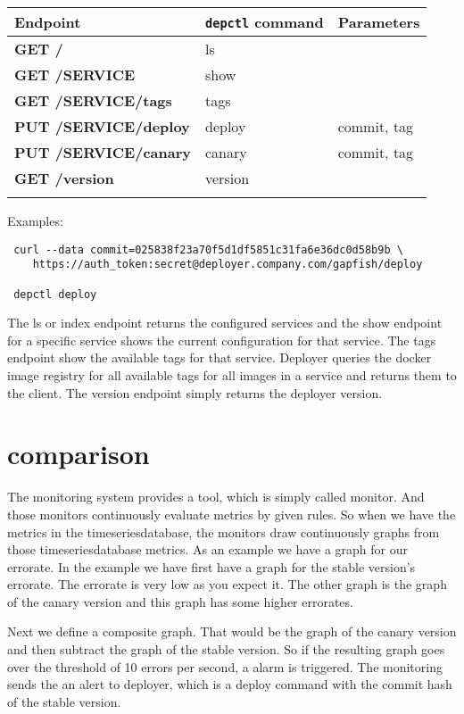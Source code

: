 \begin{table}[!htbp]
  \begin{tabular}{ l|l|l }
    Endpoint & \texttt{depctl} command & Parameters \\
    \hline \hline
    \textbf{GET /} & ls & \\
    \textbf{GET /SERVICE} & show & \\
    \textbf{GET /SERVICE/tags} & tags & \\
    \textbf{PUT /SERVICE/deploy} & deploy & commit, tag \\
    \textbf{PUT /SERVICE/canary} & canary & commit, tag \\
    \textbf{GET /version} & version & \\
    \multicolumn{3}{l}{} %
  \end{tabular}

  Examples:

\begin{verbatim}
 curl --data commit=025838f23a70f5d1df5851c31fa6e36dc0d58b9b \
    https://auth_token:secret@deployer.company.com/gapfish/deploy

 depctl deploy
\end{verbatim}
\end{table}

The ls or index endpoint returns the configured services and the show endpoint for a
specific service shows the current configuration for that service. The tags endpoint show
the available tags for that service. Deployer queries the docker image registry for all
available tags for all images in a service and returns them to the client. The version
endpoint simply returns the deployer version.

\section{comparison}
The monitoring system provides a tool, which is simply called monitor. And those monitors
continuously evaluate metrics by given rules. So when we have the metrics in the
timeseriesdatabase, the monitors draw continuously graphs from those timeseriesdatabase
metrics. As an example we have a graph for our errorate. In the example we have first have
a graph for the stable version's errorate. The errorate is very low as you expect it. The
other graph is the graph of the canary version and this graph has some higher errorates.

Next we define a composite graph. That would be the graph of the canary version and then
subtract the graph of the stable version. So if the resulting graph goes over the
threshold of 10 errors per second, a alarm is triggered. The monitoring sends the an alert
to deployer, which is a deploy command with the commit hash of the stable version.

